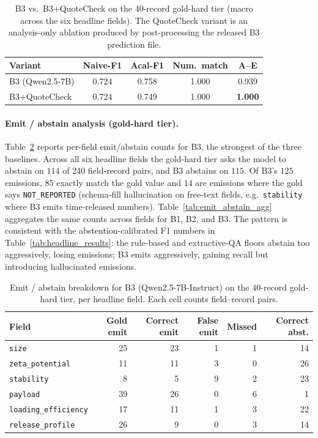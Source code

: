 \documentclass{article}
\newcommand{\NR}{\texttt{NOT\_REPORTED}}
\begin{document}
\begin{table}[h]
\centering
\caption{B3 vs.\ B3+QuoteCheck on the 40-record gold-hard tier
(macro across the six headline fields). The QuoteCheck variant is an
analysis-only ablation produced by post-processing the released B3
prediction file.}
\label{tab:b3_quotecheck}
\small
\setlength{\tabcolsep}{6pt}
\begin{tabular}{@{}lcccc@{}}
\toprule
\textbf{Variant}      & \textbf{Naive-F1} & \textbf{Acal-F1} & \textbf{Num.\ match} & \textbf{A--E} \\
\midrule
B3 (Qwen2.5-7B)       & 0.724 & 0.758 & 1.000 & 0.939 \\
B3+QuoteCheck         & 0.724 & 0.749 & 1.000 & \textbf{1.000} \\
\bottomrule
\end{tabular}
\end{table}

\paragraph{Emit / abstain analysis (gold-hard tier).}
Table~\ref{tab:emit_abstain_b3} reports per-field emit/abstain counts
for B3, the strongest of the three baselines. Across all six headline
fields the gold-hard tier asks the model to abstain on $114$ of $240$
field-record pairs, and B3 abstains on $115$. Of B3's $125$ emissions,
$85$ exactly match the gold value and $14$ are emissions where the
gold says \NR{} (schema-fill hallucination on free-text fields, e.g.\
\texttt{stability} where B3 emits time-released numbers).
Table~\ref{tab:emit_abstain_agg} aggregates the same counts across
fields for B1, B2, and B3. The pattern is consistent with the
abstention-calibrated F1 numbers in Table~\ref{tab:headline_results}:
the rule-based and extractive-QA floors abstain too aggressively,
losing emissions; B3 emits aggressively, gaining recall but introducing
hallucinated emissions.

\begin{table}[h]
\centering
\caption{Emit / abstain breakdown for B3 (Qwen2.5-7B-Instruct) on the
40-record gold-hard tier, per headline field. Each cell counts
field--record pairs.}
\label{tab:emit_abstain_b3}
\small
\setlength{\tabcolsep}{6pt}
\begin{tabular}{@{}lrrrrr@{}}
\toprule
\textbf{Field} & \textbf{Gold emit} & \textbf{Correct emit} & \textbf{False emit} & \textbf{Missed} & \textbf{Correct abst.} \\
\midrule
\texttt{size}                & 25 & 23 &  1 &  1 & 14 \\
\texttt{zeta\_potential}     & 11 & 11 &  3 &  0 & 26 \\
\texttt{stability}           &  8 &  5 &  9 &  2 & 23 \\
\texttt{payload}             & 39 & 26 &  0 &  6 &  1 \\
\texttt{loading\_efficiency} & 17 & 11 &  1 &  3 & 22 \\
\texttt{release\_profile}    & 26 &  9 &  0 &  3 & 14 \\
\bottomrule
\end{tabular}
\end{table}
\end{document}
